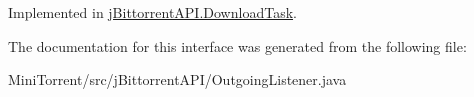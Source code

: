 Implemented in \hyperlink{classj_bittorrent_a_p_i_1_1_download_task_aaa3fad9c3cd6b12c46e76d291313060f}{jBittorrentAPI.DownloadTask}.

The documentation for this interface was generated from the following file:\begin{DoxyCompactItemize}
\item 
MiniTorrent/src/jBittorrentAPI/OutgoingListener.java\end{DoxyCompactItemize}
